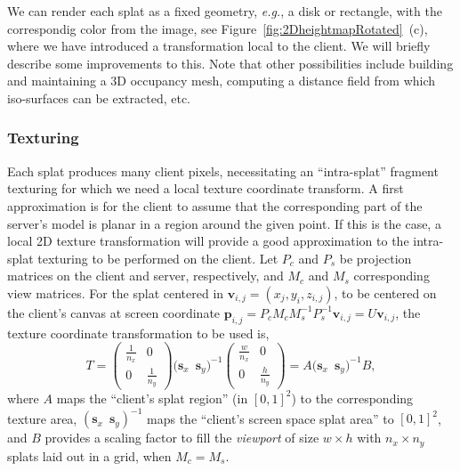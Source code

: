 \documentclass[10pt,conference,compsocconf]{IEEEtran}
\newcommand{\pv}{\mathbf{p}}
\newcommand{\sv}{\mathbf{s}}
\newcommand{\vv}{\mathbf{v}}
\newcommand{\eg}{{\em e.g.}}
\begin{document}
We can render each splat as a fixed geometry, \eg, a disk or rectangle, with the
correspondig color from the image, see Figure~\ref{fig:2DheightmapRotated}~(c),
where we have introduced a transformation local to the client.  We will briefly
describe some improvements to this. Note that other possibilities include
building and maintaining a 3D occupancy mesh, computing a distance field from
which iso-surfaces can be extracted, etc.

\subsubsection{Texturing}

Each splat produces many client pixels, necessitating an ``intra-splat''
fragment texturing for which we need a local texture coordinate transform.
A first approximation is for the client to assume that the corresponding part of
the server's model is planar in a region around the given point. If this is the
case, a local 2D texture transformation will provide a good approximation to the
intra-splat texturing to be performed on the client. Let $P_c$ and $P_s$ be
projection matrices on the client and server, respectively, and $M_c$ and $M_s$
corresponding view matrices. For the splat centered in $\vv_{i, j} = (x_j, y_i,
z_{i, j})$, to be centered on the client's canvas at screen coordinate $\pv_{i,
j} = P_c M_c M_s^{-1} P_s^{-1}\vv_{i, j} = U\vv_{i, j}$, the texture coordinate
transformation to be used is,
\[
  T =
  \begin{pmatrix}
    \frac{1}{n_x} & 0 \\
    0 & \frac{1}{n_y}
  \end{pmatrix}
  \Big( \sv_x \, \, \, \sv_y \Big)^{-1}
  \begin{pmatrix} 
    \frac{w}{n_x} & 0 \\
     0 & \frac{h}{n_y}
  \end{pmatrix}
   =
  A
  \Big( \sv_x \, \, \, \sv_y \Big)^{-1}
  B,
\]
where $A$ maps the ``client's splat region'' (in $[0, 1]^2$) to the
corresponding texture area, $(\sv_{x} \, \, \, \sv_{y})^{-1}$ maps the
``client's screen space splat area'' to $[0, 1]^2$, and $B$ provides a scaling
factor to fill the {\em viewport} of size $w \times h$ with $n_x \times n_y$
splats laid out in a grid, when $M_c=M_s$.
%
\end{document}
